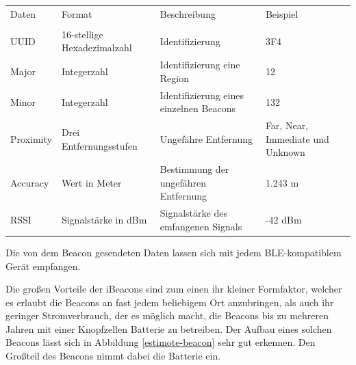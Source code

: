\begin{tabular}{p{2cm}p{5cm}p{5cm}p{4cm}}
	\\
	Daten & Format & Beschreibung & Beispiel \\ \\
	UUID & 16-stellige Hexadezimalzahl & Identifizierung & 3F4 \\
	Major & Integerzahl & Identifizierung eine Region & 12 \\
	Minor & Integerzahl & Identifizierung eines einzelnen Beacons & 132 \\
	Proximity & Drei Entfernungsstufen & Ungefähre Entfernung & Far, Near, Immediate und Unknown \\
	Accuracy & Wert in Meter & Bestimmung der ungefähren Entfernung & 1.243 m \\
	RSSI & Signalstärke in dBm & Signalstärke des emfangenen Signals & -42 dBm \\
\end{tabular}


Die von dem Beacon gesendeten Daten lassen sich mit jedem BLE-kompatiblem Gerät empfangen.



Die großen Vorteile der iBeacons sind zum einen ihr kleiner Formfaktor, welcher es erlaubt die Beacons an fast jedem beliebigem Ort anzubringen, als auch ihr geringer Stromverbrauch, der es möglich macht, die Beacons bis zu mehreren Jahren mit einer Knopfzellen Batterie zu betreiben. Der Aufbau eines solchen Beacons lässt sich in Abbildung \ref{estimote-beacon} sehr gut erkennen. Den Großteil des Beacons nimmt dabei die Batterie ein. 


